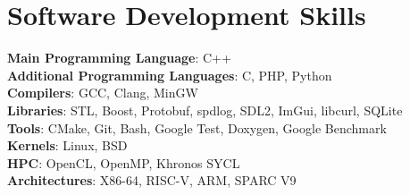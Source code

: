 \documentclass[a4paper,11pt]{article}
\makeatletter
\newcommand{\resumeSubheading}[4]{
    \vspace{-2pt}\item
    \begin{tabular*}{0.97\textwidth}[t]{l@{\extracolsep{\fill}}r}
        \textbf{#1} & #2 \\
        \textit{\small #3} & \textit{\small #4} \\
    \end{tabular*}\vspace{-10pt}
}
\newcommand{\resumeSubHeadingListStart}{\begin{itemize}[leftmargin=0.15in, label={}]}
\newcommand{\resumeSubHeadingListEnd}{\end{itemize}}
\makeatother
\begin{document}

\section{Software Development Skills}
\begin{itemize}[leftmargin=0.15in, label={}]
    \normalsize{\item{
                    \textbf{Main Programming Language}{: C++} \\
                    \textbf{Additional Programming Languages}{: C, PHP, Python} \\
                    \textbf{Compilers}{: GCC, Clang, MinGW} \\
                    \textbf{Libraries}{: STL, Boost, Protobuf, spdlog, SDL2, ImGui, libcurl, SQLite} \\
                    \textbf{Tools}{: CMake, Git, Bash, Google Test, Doxygen, Google Benchmark} \\
                    \textbf{Kernels}{: Linux, BSD} \\
                    \textbf{HPC}{: OpenCL, OpenMP, Khronos SYCL} \\
                    \textbf{Architectures}{: X86-64, RISC-V, ARM, SPARC V9} \\
              }}
\end{itemize}
\end{document}

